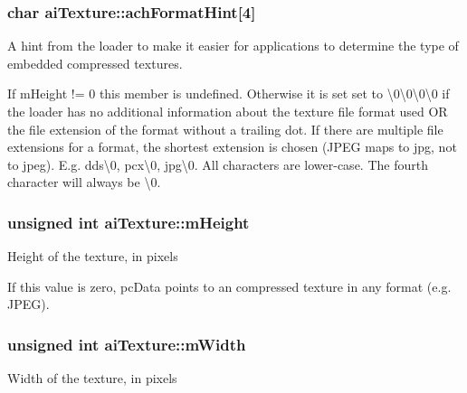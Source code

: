 \subsubsection[{\texorpdfstring{ach\+Format\+Hint}{achFormatHint}}]{\setlength{\rightskip}{0pt plus 5cm}char ai\+Texture\+::ach\+Format\+Hint\mbox{[}4\mbox{]}}\hypertarget{structai_texture_aa9f44996acf3b301bfeb4e5348311540}{}\label{structai_texture_aa9f44996acf3b301bfeb4e5348311540}
A hint from the loader to make it easier for applications to determine the type of embedded compressed textures.

If m\+Height != 0 this member is undefined. Otherwise it is set set to \textquotesingle{}\textbackslash{}0\textbackslash{}0\textbackslash{}0\textbackslash{}0\textquotesingle{} if the loader has no additional information about the texture file format used OR the file extension of the format without a trailing dot. If there are multiple file extensions for a format, the shortest extension is chosen (J\+P\+EG maps to \textquotesingle{}jpg\textquotesingle{}, not to \textquotesingle{}jpeg\textquotesingle{}). E.\+g. \textquotesingle{}dds\textbackslash{}0\textquotesingle{}, \textquotesingle{}pcx\textbackslash{}0\textquotesingle{}, \textquotesingle{}jpg\textbackslash{}0\textquotesingle{}. All characters are lower-\/case. The fourth character will always be \textquotesingle{}\textbackslash{}0\textquotesingle{}. 
\subsubsection[{\texorpdfstring{m\+Height}{mHeight}}]{\setlength{\rightskip}{0pt plus 5cm}unsigned int ai\+Texture\+::m\+Height}\hypertarget{structai_texture_ac1e2fa6f1f646e9c55e3985d4418a752}{}\label{structai_texture_ac1e2fa6f1f646e9c55e3985d4418a752}
Height of the texture, in pixels

If this value is zero, pc\+Data points to an compressed texture in any format (e.\+g. J\+P\+EG). 
\subsubsection[{\texorpdfstring{m\+Width}{mWidth}}]{\setlength{\rightskip}{0pt plus 5cm}unsigned int ai\+Texture\+::m\+Width}\hypertarget{structai_texture_aaa3ad8cfe44fdc4dea2db91977d92234}{}\label{structai_texture_aaa3ad8cfe44fdc4dea2db91977d92234}
Width of the texture, in pixels

